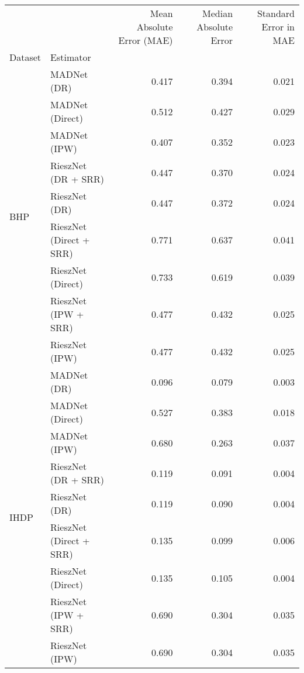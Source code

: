 \begin{tabular}{llrrr}
\toprule
 &  & Mean Absolute Error (MAE) & Median Absolute Error & Standard Error in MAE \\
Dataset & Estimator &  &  &  \\
\midrule
\multirow[t]{9}{*}{BHP} & MADNet (DR) & 0.417 & 0.394 & 0.021 \\
 & MADNet (Direct) & 0.512 & 0.427 & 0.029 \\
 & MADNet (IPW) & 0.407 & 0.352 & 0.023 \\
 & RieszNet (DR + SRR) & 0.447 & 0.370 & 0.024 \\
 & RieszNet (DR) & 0.447 & 0.372 & 0.024 \\
 & RieszNet (Direct + SRR) & 0.771 & 0.637 & 0.041 \\
 & RieszNet (Direct) & 0.733 & 0.619 & 0.039 \\
 & RieszNet (IPW + SRR) & 0.477 & 0.432 & 0.025 \\
 & RieszNet (IPW) & 0.477 & 0.432 & 0.025 \\
\cline{1-5}
\multirow[t]{9}{*}{IHDP} & MADNet (DR) & 0.096 & 0.079 & 0.003 \\
 & MADNet (Direct) & 0.527 & 0.383 & 0.018 \\
 & MADNet (IPW) & 0.680 & 0.263 & 0.037 \\
 & RieszNet (DR + SRR) & 0.119 & 0.091 & 0.004 \\
 & RieszNet (DR) & 0.119 & 0.090 & 0.004 \\
 & RieszNet (Direct + SRR) & 0.135 & 0.099 & 0.006 \\
 & RieszNet (Direct) & 0.135 & 0.105 & 0.004 \\
 & RieszNet (IPW + SRR) & 0.690 & 0.304 & 0.035 \\
 & RieszNet (IPW) & 0.690 & 0.304 & 0.035 \\
\cline{1-5}
\bottomrule
\end{tabular}

